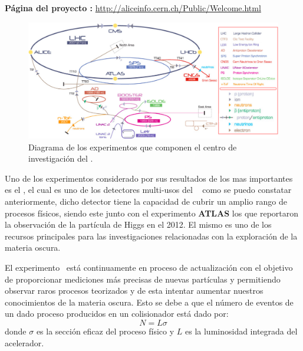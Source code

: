 \begin{itemize_f}
\textbf{Página del proyecto :} \url{http://aliceinfo.cern.ch/Public/Welcome.html}


\end{itemize_f}

\begin{figure}[h!]
\centering
\includegraphics[width=.9\textwidth]{Analisis_y_Resultados/imagenes/cern.png}
\caption{Diagrama de los experimentos que componen el centro de investigación del \CERN. %
}
    \label{cern}
\end{figure}

Uno de los experimentos considerado por sus resultados de los mas importantes es el \CMS, el cual es uno de los detectores multi-usos del \CERN ~ como se puedo constatar anteriormente, dicho detector tiene la capacidad de cubrir un amplio rango de procesos físicos, siendo este junto con el experimento \textbf{ATLAS} los que reportaron la observación de la partícula de Higgs en el 2012. El mismo es uno de los recursos principales para las investigaciones relacionadas con la exploración de la materia oscura.

El experimento \LHC ~está continuamente en proceso de actualización con el objetivo de proporcionar mediciones más precisas de nuevas partículas y permitiendo observar raros procesos teorizados y de esta intentar aumentar  nuestros conocimientos de la materia oscura. Esto se debe a que el número de eventos de un dado proceso producidos en un colisionador está dado por:
\begin{equation}
N = L \sigma
\end{equation}
donde $\sigma$ es la sección eficaz del proceso físico y $L$ es la luminosidad integrada del acelerador.

